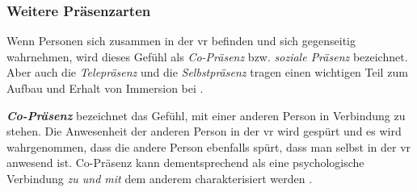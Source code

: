 \documentclass[a4paper,11pt]{article}%
\renewcommand{\\}{\vspace*{0.5\baselineskip} \newline}
\begin{document}
%			
			


		\subsubsection{Weitere Präsenzarten}
Wenn Personen sich zusammen in der \ac{vr} befinden und sich gegenseitig wahrnehmen, wird dieses Gefühl als \textit{Co-Präsenz} bzw. \textit{soziale Präsenz} bezeichnet. Aber auch die \textit{Telepräsenz} und die \textit{Selbstpräsenz} tragen einen wichtigen Teil zum Aufbau und Erhalt von Immersion bei \citep{schuemie2001research}.

\textbf{\textit{Co-Präsenz}} bezeichnet das Gefühl, mit einer anderen Person in Verbindung zu stehen.
Die Anwesenheit der anderen Person in der \ac{vr} wird gespürt und es wird wahrgenommen, dass die andere Person ebenfalls spürt, dass man selbst in der \ac{vr} anwesend ist. 
Co-Präsenz kann dementsprechend als eine psychologische Verbindung \textit{zu und mit} dem anderem charakterisiert werden \citep[179-182]{ijsselsteijn2001presence}.
\end{document}
